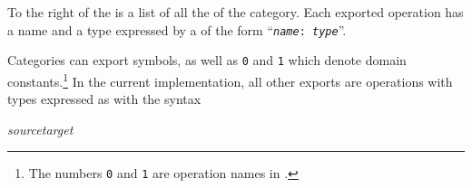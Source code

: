 
To the right of the  is a list of
all the  of the category.
Each exported operation has a name and a type expressed by a
 of the form
``{\frenchspacing\tt {\it name}: {\it type}}''.

Categories can export symbols, as well as
{\tt 0} and {\tt 1} which denote
domain constants.\footnote{The
numbers {\tt 0} and {\tt 1} are operation names in \Language{}.}
In the current implementation, all other exports are operations with
types expressed as  with the syntax
\begin{center}
{\it
source\quad{\tt ->}\quad target
}
\end{center}

